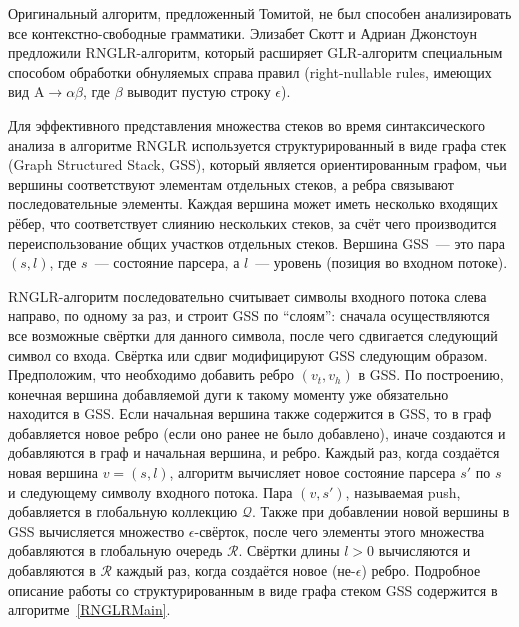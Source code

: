 Оригинальный алгоритм, предложенный Томитой, не был способен анализировать все контекстно-свободные грамматики. Элизабет Скотт и Адриан Джонстоун предложили RNGLR-алгоритм, который расширяет GLR-алгоритм специальным способом обработки обнуляемых справа правил (right-nullable rules, имеющих вид $\mathrm{A} \rightarrow \alpha \beta$, где $\beta$ выводит пустую строку $\epsilon$).

Для эффективного представления множества стеков во время синтаксического анализа в алгоритме RNGLR используется структурированный в виде графа стек (Graph Structured Stack, GSS), который является ориентированным графом, чьи вершины соответствуют  элементам отдельных стеков, а ребра связывают последовательные элементы. Каждая вершина может иметь несколько входящих рёбер, что соответствует слиянию нескольких стеков, за счёт чего производится переиспользование общих участков отдельных стеков. Вершина GSS~--- это пара $(s,l)$, где $s$~--- состояние парсера, а $l$~--- уровень (позиция во входном потоке).

RNGLR-алгоритм последовательно считывает символы входного потока слева направо, по одному за раз, и строит GSS по ``слоям'': сначала осуществляются все возможные свёртки для данного символа, после чего сдвигается следующий символ со входа. Свёртка или сдвиг модифицируют GSS следующим образом. Предположим, что необходимо добавить ребро $(v_t,v_h)$ в GSS. По построению, конечная вершина добавляемой дуги к такому моменту уже обязательно находится в GSS. Если начальная вершина также содержится в GSS, то в граф добавляется новое ребро (если оно ранее не было добавлено), иначе создаются и добавляются в граф и начальная вершина, и ребро. Каждый раз, когда создаётся новая вершина $v=(s,l)$, алгоритм вычисляет новое состояние парсера $s'$ по $s$ и следующему символу входного потока. Пара $(v,s')$, называемая push, добавляется в глобальную коллекцию $\mathcal{Q}$. Также при добавлении новой вершины в GSS вычисляется множество $\epsilon$-свёрток, после чего элементы этого множества добавляются в глобальную очередь $\mathcal{R}$. Свёртки длины $l>0$ вычисляются и добавляются в $\mathcal{R}$ каждый раз, когда создаётся новое (не-$\epsilon$) ребро. Подробное описание работы со структурированным в виде графа стеком GSS содержится в алгоритме~\ref{RNGLRMain}.

